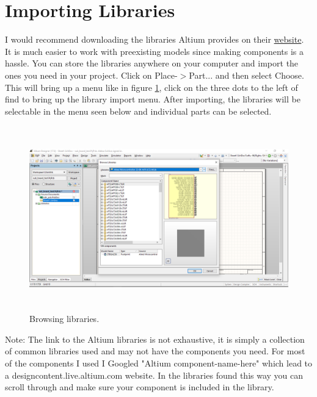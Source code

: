 \documentclass{report}
\begin{document}
	\section{Importing Libraries}
	I would recommend downloading the libraries Altium provides on their \href{http://techdocs.altium.com/display/ADOH/Download+Libraries}{website}. It is much easier to work with preexisting models since making components is a hassle. You can store the libraries anywhere on your computer and import the ones you need in your project. Click on Place-$>$Part... and then select Choose. This will bring up a menu like in figure \ref{fig 7}, click on the three dots to the left of find to bring up the library import menu. After importing, the libraries will be selectable in the menu seen below and individual parts can be selected.
	\begin{figure}[H]	
		\centering
		\includegraphics[width=16cm, height=8cm]{pics/library.png}
		\caption{Browsing libraries.}
		\label{fig 7}
	\end{figure}

	Note: The link to the Altium libraries is not exhaustive, it is simply a collection of common libraries used and may not have the components you need. For most of the components I used I Googled "Altium component-name-here" which lead to a designcontent.live.altium.com website. In the libraries found this way you can scroll through and make sure your component is included in the library.
\end{document}
